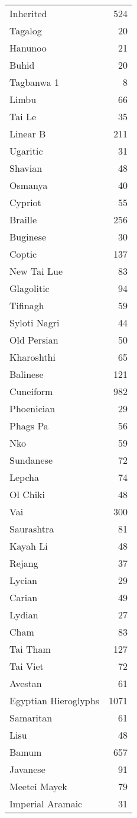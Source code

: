 \begin{longtable}{lr}
Inherited	&524\\
Tagalog	&20\\
Hanunoo	&21\\
Buhid	&20\\
Tagbanwa	1&8\\
Limbu	&66\\
Tai Le	 &35\\
Linear B	&211\\
Ugaritic	&31\\
Shavian	&48\\
Osmanya	&40\\
Cypriot	&55\\
Braille	&256\\
Buginese	&30\\
Coptic	 &137\\
New Tai Lue	&83\\
Glagolitic	&94\\
Tifinagh	&59\\
Syloti Nagri	&44\\
Old Persian	&50\\
Kharoshthi	&65\\
Balinese	&121\\
Cuneiform	&982\\
Phoenician	&29\\
Phags Pa	&56\\
Nko	 &59\\
Sundanese	&72\\
Lepcha	 &74\\
Ol Chiki	&48\\
Vai	&300\\
Saurashtra	&81\\
Kayah Li	&48\\
Rejang	 &37\\
Lycian	 &29\\
Carian	 &49\\
Lydian	 &27\\
Cham	 &83\\
Tai Tham	&127\\
Tai Viet	&72\\
Avestan	&61\\
Egyptian Hieroglyphs	&1071\\
Samaritan	 &61\\
Lisu	&48\\
Bamum	&657\\
Javanese	&91\\
Meetei Mayek	&79\\
Imperial Aramaic	&31\\

\end{longtable}
